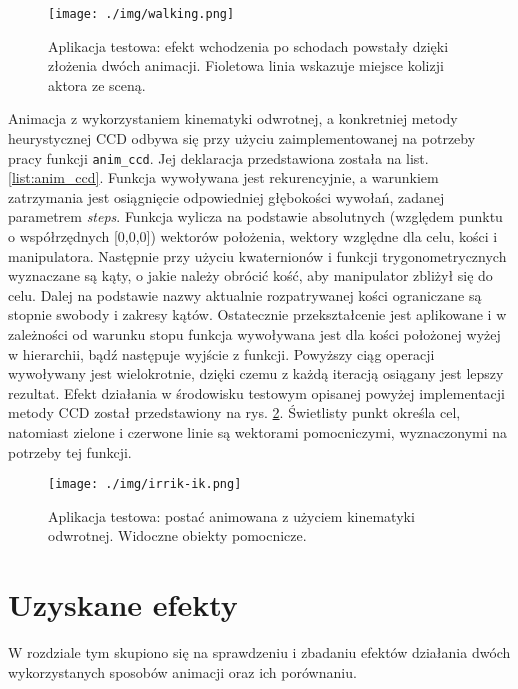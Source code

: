 \documentclass[11pt]{mwrep}
\begin{document}
  \begin{figure}
  \centering
    \texttt{[image: ./img/walking.png]}
  \caption{Aplikacja testowa: efekt wchodzenia po schodach powstały dzięki złożenia dwóch animacji. Fioletowa linia wskazuje miejsce kolizji aktora ze sceną.}
  \label{img:irrikwalking}
  \end{figure}



Animacja z wykorzystaniem kinematyki odwrotnej, a konkretniej metody heurystycznej CCD odbywa się przy użyciu zaimplementowanej na potrzeby pracy funkcji \texttt{anim\_ccd}. Jej deklaracja przedstawiona została na list. \ref{list:anim_ccd}. Funkcja wywoływana jest rekurencyjnie, a warunkiem zatrzymania jest osiągnięcie odpowiedniej głębokości wywołań, zadanej parametrem \textit{steps}. Funkcja wylicza na podstawie absolutnych (względem punktu o współrzędnych [0,0,0]) wektorów położenia, wektory względne dla celu, kości i manipulatora. Następnie przy użyciu kwaternionów i funkcji trygonometrycznych wyznaczane są kąty, o jakie należy obrócić kość, aby manipulator zbliżył się do celu. Dalej na podstawie nazwy aktualnie rozpatrywanej kości ograniczane są stopnie swobody i zakresy kątów. Ostatecznie przekształcenie jest aplikowane i w zależności od warunku stopu funkcja wywoływana jest dla kości położonej wyżej w hierarchii, bądź następuje wyjście z funkcji. Powyższy ciąg operacji wywoływany jest wielokrotnie, dzięki czemu z każdą iteracją osiągany jest lepszy rezultat. Efekt działania w środowisku testowym opisanej powyżej implementacji metody CCD został przedstawiony na rys. \ref{img:irrikccd}. Świetlisty punkt określa cel, natomiast zielone i czerwone linie są wektorami pomocniczymi, wyznaczonymi na potrzeby tej funkcji.


  \begin{figure}
  \centering
    \texttt{[image: ./img/irrik-ik.png]}
  \caption{Aplikacja testowa: postać animowana z użyciem kinematyki odwrotnej. Widoczne obiekty pomocnicze.}
  \label{img:irrikccd}
  \end{figure}


\chapter{Uzyskane efekty}

W rozdziale tym skupiono się na sprawdzeniu i zbadaniu efektów działania dwóch wykorzystanych sposobów animacji oraz ich porównaniu.
\end{document}
